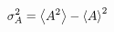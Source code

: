 

\vspace*{\fill}
\centering

\begin{align*}
    \sigma_{A}^2 = \expval{A^2} - \expval{A}^2
\end{align*}

\centering
\vspace*{\fill}

